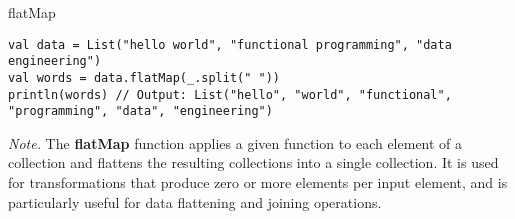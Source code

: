\begin{table}[h!]
\caption{flatMap}
\begin{lstlisting}
val data = List("hello world", "functional programming", "data engineering")
val words = data.flatMap(_.split(" "))
println(words) // Output: List("hello", "world", "functional", "programming", "data", "engineering")
\end{lstlisting}
\small
\textit{Note.} The \textbf{flatMap} function applies a given function to each element of a collection and flattens the resulting collections into a single collection. It is used for transformations that produce zero or more elements per input element, and is particularly useful for data flattening and joining operations.
\end{table}